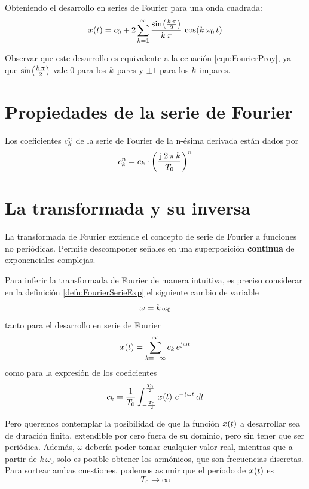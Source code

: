 \begin{mdframed}[style=ExampleFrame]
    Obteniendo el desarrollo en series de Fourier para una onda cuadrada:
    \[
        \fx[x]{t} = c_0 + 2 \sum_{\kth=1}^{\infty} \frac{\fx[\sin]{\frac{\kth \, \pi}{2}}}{\kth \, \pi} \, \fx[\cos]{\kth \, \omega_0 \, t}
    \]

    Observar que este desarrollo es equivalente a la ecuación \ref{eqn:FourierProy}, ya que $\fx[\sin]{\frac{\kth \, \pi}{2}}$ vale 0 para los $\kth$ pares y $\pm1$ para los $\kth$ impares.
\end{mdframed}

\section{Propiedades de la serie de Fourier}

\begin{mdframed}[style=PropertyFrame]
    \begin{prop}
    \end{prop}
    Los coeficientes $c_\kth^\nth$ de la serie de Fourier de la n-ésima derivada están dados por
    \[
        c_\kth^\nth = c_\kth \cdot \inParentheses{\frac{\iu \, 2 \, \pi \, \kth}{T_0}}^\nth
    \]
\end{mdframed}

\section{La transformada y su inversa}

La transformada de Fourier extiende el concepto de serie de Fourier a funciones no periódicas.
Permite descomponer señales en una superposición \textbf{continua} de exponenciales complejas.

Para inferir la transformada de Fourier de manera intuitiva, es preciso considerar en la definición \ref{defn:FourierSerieExp} el siguiente cambio de variable
\[
    \omega = \kth \, \omega_0
\]
tanto para el desarrollo en serie de Fourier
\begin{equation}
    \fx[x]{t}
    = \sum_{\kth=-\infty}^\infty
    c_\kth \, \complexExp
    \label{eqn:serieFourierOmega}
\end{equation}
como para la expresión de los coeficientes
\[
    c_\kth =
    \frac{1}{T_0}
    \int_{-\frac{T_0}{2}}^{\frac{T_0}{2}} \fx[x]{t} \, e^{- \iu \omega t}
    \, \dif t
\]

Pero queremos contemplar la posibilidad de que la función $\fx[x]{t}$ a desarrollar sea de duración finita, extendible por cero fuera de su dominio, pero sin tener que ser periódica.
Además, $\omega$ debería poder tomar cualquier valor real, mientras que a partir de $k \, \omega_0$ solo es posible obtener los armónicos, que son frecuencias discretas.
Para sortear ambas cuestiones, podemos asumir que el período de $\fx[x]{t}$ es
\[
    T_0 \to \infty
\]

